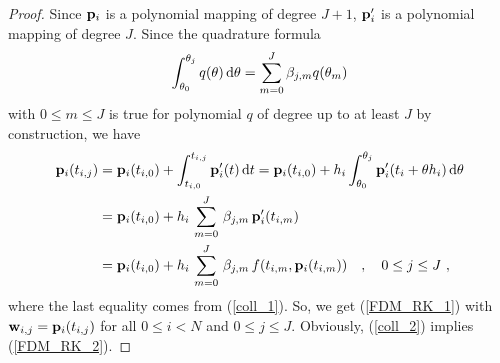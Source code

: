 \begin{proof}
  Since $\mathbf{p}_i$ is a polynomial mapping of degree $J+1$,
$\mathbf{p}_i'$ is a polynomial mapping of degree $J$.  Since the
quadrature formula
\begin{equation}\label{colRKorderJp1}
  \int_{\theta_0}^{\theta_j} q(\theta) \,\mathrm{d}\theta
  = \sum_{m=0}^J \beta_{j,m} q(\theta_m)
\end{equation}
with $0\leq m \leq J$ is true for polynomial $q$ of degree up to at
least $J$ by construction, we have
\begin{align*}
\mathbf{p}_i(t_{i,j}) &= \mathbf{p}_i(t_{i,0}) +
\int_{t_{i,0}}^{t_{i,j}} \mathbf{p}_i'(t) \,\mathrm{d}t
= \mathbf{p}_i(t_{i,0}) +
h_i \int_{\theta_0}^{\theta_j} \mathbf{p}_i'(t_i+\theta h_i) \,\mathrm{d}\theta \\
&= \mathbf{p}_i(t_{i,0}) +
h_i\,\sum_{m=0}^J\,\beta_{j,m}\,\mathbf{p}_i'(t_{i,m}) \\
&= \mathbf{p}_i(t_{i,0}) +
h_i\,\sum_{m=0}^J\,\beta_{j,m}\,f(t_{i,m},\mathbf{p}_i(t_{i,m})) \quad ,
\quad 0 \leq j \leq J \ , 
\end{align*}
where the last equality comes from
(\ref{coll_1}).  So, we get (\ref{FDM_RK_1}) with
$\mathbf{w}_{i,j} = \mathbf{p}_i(t_{i,j})$
for all $0\leq i < N$ and $0\leq j \leq J$.  Obviously,
(\ref{coll_2}) implies (\ref{FDM_RK_2}).


\end{proof}
